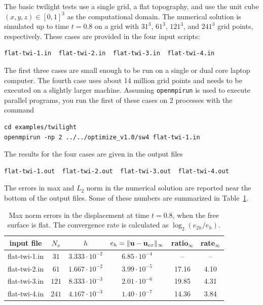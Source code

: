 \documentclass[11pt]{report}
\newcommand{\ub}{{\bf u}}
\begin{document}
The basic twilight tests use a single grid, a flat topography, and use the unit cube
$(x,y,z)\in[0,1]^3$ as the computational domain. The numerical solution is simulated up to time
$t=0.8$ on a grid with $31^3$, $61^3$, $121^3$, and $241^3$ grid points, respectively. These cases
are provided in the four input scripts:
\begin{verbatim}
flat-twi-1.in  flat-twi-2.in  flat-twi-3.in  flat-twi-4.in
\end{verbatim}
The first three cases are small enough to be run on a single or dual core laptop computer. The
fourth case uses about 14 million grid points and needs to be executed on a slightly larger
machine. Assuming \verb+openmpirun+ is used to execute parallel programs, you run the first of these
cases on 2 processes with the command
\begin{verbatim}
cd examples/twilight
openmpirun -np 2 ../../optimize_v1.0/sw4 flat-twi-1.in
\end{verbatim}
The results for the four cases are given in the output files
\begin{verbatim}
flat-twi-1.out  flat-twi-2.out  flat-twi-3.out  flat-twi-4.out
\end{verbatim}
The errors in max and $L_2$ norm in the numerical solution are reported near the bottom of the
output files. Some of these numbers are summarized in Table~\ref{tab:twi-err}.
\begin{table}
\begin{center}
\begin{tabular}{| c | c | c | c | c  | c | }
\hline
input file & $N_x$ & $h$ & $e_h=\| \ub - \ub_{ex}\|_\infty$ & ratio$_\infty$ & rate$_\infty$ \\ \hline
flat-twi-1.in & $31$  & $3.333\cdot 10^{-2}$  & $6.85\cdot 10^{-4}$ & --   & --   \\ \hline
flat-twi-2.in & $61$  & $1.667\cdot 10^{-2}$  & $3.99\cdot 10^{-5}$ &17.16 & 4.10 \\ \hline
flat-twi-3.in & $121$ & $8.333\cdot 10^{-3}$  & $2.01\cdot 10^{-6}$ &19.85 & 4.31 \\ \hline
flat-twi-4.in & $241$ & $4.167\cdot 10^{-3}$  & $1.40\cdot 10^{-7}$ &14.36 & 3.84 \\ \hline
\end{tabular}
\caption{Max norm errors in the displacement at time $t=0.8$, when the free
  surface is flat. The convergence rate is calculated as $\log_2(e_{2h}/e_h)$.}
\label{tab:twi-err}
\end{center}
\end{table}
\end{document}
